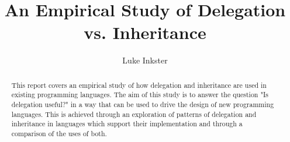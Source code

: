 \documentclass[11pt
              , a4paper
              , twoside
              , openright
              ]{report}
\title{An Empirical Study of Delegation vs. Inheritance}
\author{Luke Inkster}
\date{}
\providecommand{\DIFaddbegin}{} %
\providecommand{\DIFaddend}{} %
\providecommand{\DIFdelbegin}{} %
\providecommand{\DIFdelend}{} %
\begin{document}
\frontmatter

\DIFdelbegin %


\DIFdelend \DIFaddbegin \newpage \DIFaddend \begin{abstract}

This report covers an empirical study of how delegation and inheritance are used in existing programming languages. The aim of this study is to answer the question "Is delegation useful?" in a way that can be used to drive the design of new programming languages. This is achieved through an exploration of patterns of delegation and inheritance in languages which support their implementation and through a comparison of the uses of both.

\end{abstract} \DIFaddbegin \newpage 
\DIFaddend 

\DIFdelbegin %

\DIFdelend \maketitle


\tableofcontents


\DIFdelbegin %

\DIFdelend \mainmatter

\DIFdelbegin %
\end{document}

